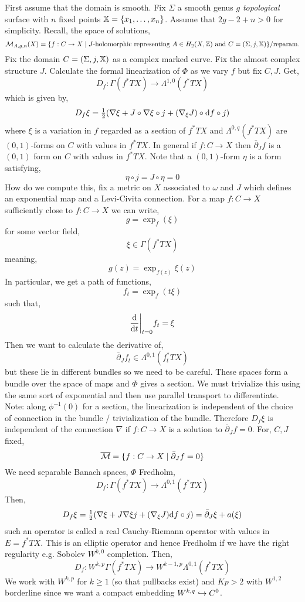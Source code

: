 \documentclass[12pt]{article}
\newcommand{\dbar}{\bar{\partial}}
\begin{document}
First assume that the domain is smooth. Fix $\Sigma$ a smooth genus $g$ \textit{topological} surface with $n$ fixed points $\mathbb{X} = \{ x_1, \dots, x_n \}$. Assume that $2g - 2 + n > 0$ for simplicity. Recall, the space of solutions,
\[ \mathcal{M}_{A,g,n}(X) = \{ f : C \to X \mid J\text{-holomorphic representing } A \in H_2(X, \mathbb{Z}) \text{ and } C = (\Sigma, j, \mathbb{X}) \} / \text{reparam.} \]
Fix the domain $C = (\Sigma, j, \mathbb{X})$ as a complex marked curve. Fix the almost complex structure $J$. Calculate the formal linearization of $\Phi$ as we vary $f$ but fix $C, J$. Get,
\[ D_f : \Gamma(f^* TX) \to \Lambda^{1,0}(f^* TX) \]
which is given by,
\[ D_f \xi = \tfrac{1}{2} (\nabla \xi + J \circ \nabla \xi \circ j + (\nabla_\xi J) \circ \mathrm{d}{f} \circ j) \]
where $\xi$ is a variation in $f$ regarded as a section of $f^* TX$ and $\Lambda^{0,q} (f^* TX)$ are $(0,1)$-forms on $C$ with values in $f^* TX$. In general if $f : C \to X$ then $\dbar_J f$ is a $(0,1)$ form on $C$ with values in $f^* TX$. Note that a $(0,1)$-form $\eta$ is a form satisfying,
\[ \eta \circ j = J \circ \eta = 0 \]
How do we compute this, fix a metric on $X$ associated to $\omega$ and $J$ which defines an exponential map and a Levi-Civita connection. For a map $f : C \to X$ sufficiently close to $f : C \to X$ we can write,
\[ g = \exp_f(\xi) \]
for some vector field,
\[ \xi \in \Gamma(f^* TX) \]
meaning,
\[ g(z) = \exp_{f(z)} \xi(z) \]
In particular, we get a path of functions,
\[ f_t = \exp_f(t\xi) \]
such that,
\[ \frac{\mathrm{d}{}}{\mathrm{d}{t}} \bigg|_{t = 0} f_t = \xi \]
Then we want to calculate the derivative of,
\[ \dbar_J f_t \in \Lambda^{0,1} (f_t^* TX) \]
but these lie in different bundles so we need to be careful. These spaces form a bundle over the space of maps and $\Phi$ gives a section. We must trivialize this using the same sort of exponential and then use parallel transport to differentiate. 
\bigskip\\
Note: along $\phi^{-1}(0)$ for a section, the linearization is independent of the choice of connection in the bundle / trivialization of the bundle. Therefore $D_f \xi$ is independent of the connection $\nabla$ if $f : C \to X$ is a solution to $\dbar_J f = 0$. For, $C, J$ fixed,
\[ \Mbar = \{ f : C \to X \mid \dbar_J f = 0 \} \]
We need separable Banach spaces, $\Phi$ Fredholm,
\[ D_f : \Gamma(f^* TX) \to \Lambda^{0,1} (f^* TX) \]
Then,
\[ D_f \xi = \tfrac{1}{2}(\nabla \xi + J \nabla \xi j + (\nabla_\xi J) \d{f} \circ j) = \dbar_J \xi + a(\xi) \]
such an operator is called a real Cauchy-Riemann operator with values in $E = f^* TX$. This is an elliptic operator and hence Fredholm if we have the right regularity e.g. Sobolev $W^{k,0}$ completion. Then,
\[ D_f : W^{k,p} \Gamma(f^* TX) \to W^{k-1, p} \Lambda^{0,1}(f^* TX) \]
We work with $W^{k,p}$ for $k \ge 1$ (so that pullbacks exist) and $Kp > 2$ with $W^{1,2}$ borderline since we want a compact embedding $W^{k,q} \hookrightarrow C^0$. 
\end{document}
